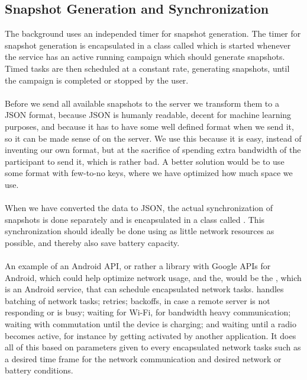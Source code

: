 \subsection{Snapshot Generation and Synchronization}
\label{sub:background_sensor_service_snapshot_generation_and_synchronization}

The background  uses an independed timer for snapshot generation. The timer for snapshot generation is encapsulated in a class called  which is started whenever the service has an active running campaign which should generate snapshots. Timed tasks are then scheduled at a constant rate, generating snapshots, until the campaign is completed or stopped by the user.
\\\\
Before we send all available snapshots to the server we transform them to a JSON format, because JSON is humanly readable, decent for machine learning purposes, and because it has to have some well defined format when we send it, so it can be made sense of on the server. We use this because it is easy, instead of inventing our own format, but at the sacrifice of spending extra bandwidth of the participant to send it, which is rather bad. A better solution would be to use some format with few-to-no keys, where we have optimized how much space we use. 
\\\\
When we have converted the data to JSON, the actual synchronization of snapshots is done separately and is encapsulated in a class called . This synchronization should ideally be done using as little network resources as possible, and thereby also save battery capacity. 
\\\\
An example of an Android API, or rather a library with Google APIs for Android, which could help optimize network usage, and the, would be the , which is an Android service, that can schedule encapsulated network tasks.  \parencite{gcmnetworkmanager} handles batching of network tasks; retries; backoffs, in case a remote server is not responding or is busy; waiting for Wi-Fi, for bandwidth heavy communication; waiting with commutation until the device is charging; and waiting until a radio becomes active, for instance by getting activated by another application. It does all of this based on parameters given to every encapsulated network tasks such as a desired time frame for the network communication and desired network or battery conditions.  
